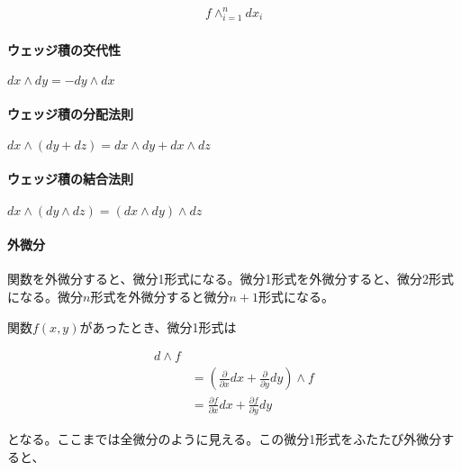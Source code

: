 \begin{equation*}
\begin{split}
f \wedge_{i=1}^{n} dx_i
\end{split}
\end{equation*}

\paragraph{ウェッジ積の交代性}

$ d x \wedge d y = - d y \wedge d x $

\paragraph{ウェッジ積の分配法則}

$ d x \wedge ( d y + d z ) = d x \wedge d y + d x \wedge d z $

\paragraph{ウェッジ積の結合法則}

$ d x \wedge (d y \wedge d z) = (d x \wedge d y) \wedge d z $

\paragraph{外微分}

関数を外微分すると、微分1形式になる。微分1形式を外微分すると、微分2形式になる。微分$n$形式を外微分すると微分$n+1$形式になる。

関数$f(x,y)$があったとき、微分1形式は

\begin{equation*}
\begin{split}
d \wedge f \\
&= (\frac{\partial}{\partial x} dx + \frac{\partial}{\partial y} dy) \wedge f\\
&= \frac{\partial f}{\partial x} dx + \frac{\partial f}{\partial y} dy
\end{split}
\end{equation*}

となる。ここまでは全微分のように見える。この微分1形式をふたたび外微分すると、

